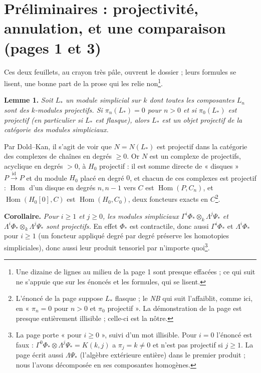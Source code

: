 \documentclass[11pt,a4paper]{article}
\begin{document}
\section*{Préliminaires : projectivité, annulation, et une comparaison (pages 1 et 3)}

Ces deux feuillets, au crayon très pâle, ouvrent le dossier ; leurs formules
se lisent, une bonne part de la prose qui les relie non\footnote{Une dizaine
de lignes au milieu de la page 1 sont presque effacées ; ce qui suit ne
s'appuie que sur les énoncés et les formules, qui se lisent.}.

\textbf{Lemme 1.} \emph{Soit $L_{*}$ un module simplicial sur $k$ dont toutes
les composantes $L_{n}$ sont des $k$-modules projectifs. Si
$\pi_{n}(L_{*}) = 0$ pour $n > 0$ et si $\pi_{0}(L_{*})$ est projectif (en
particulier si $L_{*}$ est flasque), alors $L_{*}$ est un objet projectif de
la catégorie des modules simpliciaux.}

Par Dold–Kan, il s'agit de voir que $N = N(L_{*})$ est projectif dans la
catégorie des complexes de chaînes en degrés $\geqslant 0$. Or $N$ est un
complexe de projectifs, acyclique en degrés $> 0$, à $H_{0}$ projectif : il
est somme directe de « disques » $P \xrightarrow{\mathrm{id}} P$ et du
module $H_{0}$ placé en degré $0$, et chacun de ces complexes est projectif :
$\operatorname{Hom}$ d'un disque en degrés $n, n-1$ vers $C$ est
$\operatorname{Hom}(P, C_{n})$, et $\operatorname{Hom}(H_{0}[0], C)$ est
$\operatorname{Hom}(H_{0}, C_{0})$, deux foncteurs exacts en
$C$\footnote{L'énoncé de la page suppose $L_{*}$ flasque ; le \emph{NB} qui
suit l'affaiblit, comme ici, en « $\pi_{n} = 0$ pour $n > 0$ et $\pi_{0}$
projectif ». La démonstration de la page est presque entièrement illisible ;
celle-ci est la nôtre.}.

\textbf{Corollaire.} \emph{Pour $i \geqslant 1$ et $j \geqslant 0$, les
modules simpliciaux $\Gamma^{i}\Phi_{*} \otimes_{k} \Lambda^{j}\Psi_{*}$ et
$\Lambda^{i}\Phi_{*} \otimes_{k} \Lambda^{j}\Psi_{*}$ sont projectifs.} En
effet $\Phi_{*}$ est contractile, donc aussi $\Gamma^{i}\Phi_{*}$ et
$\Lambda^{i}\Phi_{*}$ pour $i \geqslant 1$ (un foncteur appliqué degré par
degré préserve les homotopies simpliciales), donc aussi leur produit
tensoriel par n'importe quoi\footnote{La page porte « pour $i \geqslant 0$ »,
suivi d'un mot illisible. Pour $i = 0$ l'énoncé est faux :
$\Gamma^{0}\Phi_{*} \otimes \Lambda^{j}\Psi_{*} = K(k, j)$ a
$\pi_{j} = k \neq 0$ et n'est pas projectif si $j \geqslant 1$. La page écrit
aussi $\Lambda\Psi_{*}$ (l'algèbre extérieure entière) dans le premier
produit ; nous l'avons décomposée en ses composantes homogènes.}.
\end{document}

